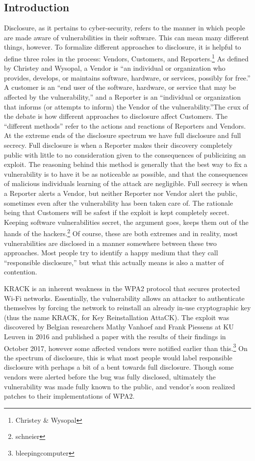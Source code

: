 \documentclass[12pt]{article}
\begin{document}
\newpage
\begin{doublespace}
\section*{Introduction}
Disclosure, as it pertains to cyber-security, refers to the manner in which
people are made aware of vulnerabilities in their software. This can mean many
different things, however. To formalize different approaches to disclosure, it
is helpful to define three roles in the process: Vendors, Customers, and
Reporters.\footnote{Christey \& Wysopal} As defined by Christey and Wysopal,
a Vendor is ``an individual or organization who provides, develops, or
maintains software, hardware, or services, possibly for free.'' A customer is 
an ``end user of the software, hardware, or service that may be affected by the
vulnerability,'' and a Reporter is an ``individual or organization that informs
(or attempts to inform) the Vendor of the vulnerability.''\footnotemark[1] The crux of the
debate is how different approaches to disclosure affect Customers. The
``different methods'' refer to the actions and reactions of Reporters and
Vendors. At the extreme ends of the disclosure spectrum we have full disclosure
and full secrecy. Full disclosure is when a Reporter makes their discovery
completely public with little to no consideration given to the consequences of
publicizing an exploit. The reasoning behind this method is generally that the
best way to fix a vulnerability is to have it be as noticeable as possible, and
that the consequences of malicious individuals learning of the attack are
negligible.
Full secrecy is when a Reporter alerts a Vendor, but neither Reporter nor
Vendor alert the public, sometimes even after the vulnerability has been taken
care of. The rationale being that Customers will be safest if the exploit is
kept completely secret. Keeping software vulnerabilities secret, the argument goes, keeps them out of the hands of the hackers.\footnote{schneier}
Of course, these are both extremes and in reality, most
vulnerabilities are disclosed in a manner somewhere between these two
approaches. Most people try to identify a happy medium that they call
``responsible disclosure,'' but what this actually means is also a matter of
contention.

KRACK is an inherent weakness in the WPA2 protocol that
secures protected Wi-Fi networks. Essentially, the vulnerability allows an
attacker to authenticate themselves by forcing the network to reinstall an
already in-use cryptographic key (thus the name KRACK, for Key Reinstallation
AttaCK). The exploit was discovered by Belgian researchers Mathy Vanhoef and
Frank Piessens at KU Leuven in 2016 and published a paper with the results
of their findings in October 2017, however some affected vendors were notified
earlier than this.\footnote{bleepingcomputer} On the spectrum of disclosure,
this is what most people would label responsible disclosure with perhaps a bit
of a bent towards full disclosure. Though some vendors were alerted before the
bug was fully disclosed, ultimately the vulnerability was made fully
known to the public, and vendor's soon realized patches to their
implementations of WPA2.


\end{doublespace}
\end{document}
